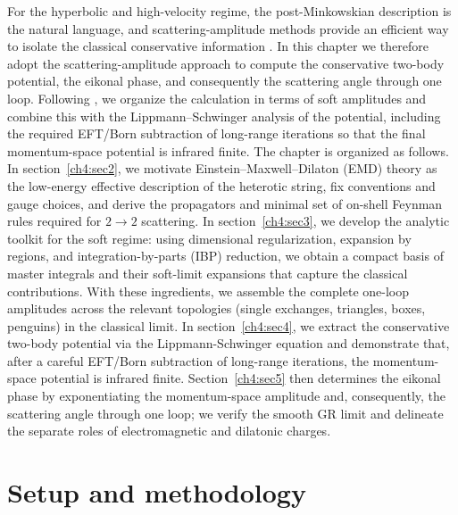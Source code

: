 For the hyperbolic and high-velocity regime, the post-Minkowskian description is the natural language, and scattering-amplitude methods provide an efficient way to isolate the classical conservative information \cite{Damour:2016gwp,Bini:2017wfr,Bini:2017xzy,Damour:2017zjx,Damour:2019lcq,Bini:2020flp,Bini:2020uiq,Damour:2020tta,Bini:2020rzn,Bini:2021gat,Bini:2022enm,Damour:2022ybd,Bini:2022wrq,Rettegno:2023ghr,Bini:2023fiz,Brandhuber:2022qbk,Brandhuber:2023hhy,Kosower:2018adc,DeAngelis:2023lvf,Cristofoli:2021vyo}. In this chapter we therefore adopt the scattering-amplitude approach to compute the conservative two-body potential, the eikonal phase, and consequently the scattering angle through one loop. Following \cite{Parra-Martinez:2020dzs}, we organize the calculation in terms of soft amplitudes and combine this with the Lippmann--Schwinger analysis of the potential, including the required EFT/Born subtraction of long-range iterations so that the final momentum-space potential is infrared finite. The chapter is organized as follows. In section~\eqref{ch4:sec2}, we motivate Einstein--Maxwell--Dilaton (EMD) theory as the low-energy effective description of the heterotic string, fix conventions and gauge choices, and derive the propagators and minimal set of on-shell Feynman rules required for $2\!\to\!2$ scattering. In section~\eqref{ch4:sec3}, we develop the analytic toolkit for the soft regime: using dimensional regularization, expansion by regions, and integration-by-parts (IBP) reduction, we obtain a compact basis of master integrals and their soft-limit expansions that capture the classical contributions. With these ingredients, we assemble the complete one-loop amplitudes across the relevant topologies (single exchanges, triangles, boxes, penguins) in the classical limit. In section~\eqref{ch4:sec4}, we extract the conservative two-body potential via the Lippmann-Schwinger equation and demonstrate that, after a careful EFT/Born subtraction of long-range iterations, the momentum-space potential is infrared finite. Section~\eqref{ch4:sec5} then determines the eikonal phase by exponentiating the momentum-space amplitude and, consequently, the scattering angle through one loop; we verify the smooth GR limit and delineate the separate roles of electromagnetic and dilatonic charges.




\section{Setup and methodology}\label{ch4:sec2}
